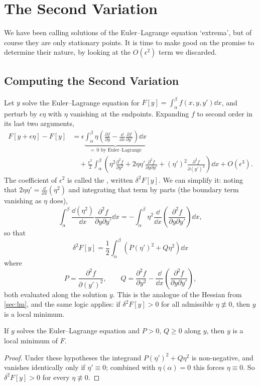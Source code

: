 \section{The Second Variation}\label{sec:secondvar}

We have been calling solutions of the Euler--Lagrange equation `extrema', but of course they are only stationary points. It is time to make good on the promise to determine their nature, by looking at the $O(\epsilon^2)$ term we discarded.

\subsection{Computing the Second Variation}

Let $y$ solve the Euler--Lagrange equation for $F[y] = \int_\alpha^\beta f(x,y,y')\dd x$, and perturb by $\epsilon\eta$ with $\eta$ vanishing at the endpoints. Expanding $f$ to second order in its last two arguments,
\begin{align*}
	F[y + \epsilon\eta] - F[y] &= \epsilon \underbrace{\int_\alpha^\beta \eta\left(\frac{\partial f}{\partial y} - \frac{\dd}{\dd x}\frac{\partial f}{\partial y'}\right)\dd x}_{= \,0 \text{ by Euler--Lagrange}} \\
	&\quad + \frac{\epsilon^2}{2}\int_\alpha^\beta\left(\eta^2 \frac{\partial^2 f}{\partial y^2} + 2\eta\eta'\frac{\partial^2 f}{\partial y \partial y'} + (\eta')^2\frac{\partial^2 f}{\partial (y')^2}\right)\dd x + O(\epsilon^3).
\end{align*}
The coefficient of $\epsilon^2$ is called the , written $\delta^2 F[y]$. We can simplify it: noting that $2\eta\eta' = \frac{\dd}{\dd x}(\eta^2)$ and integrating that term by parts (the boundary term vanishing as $\eta$ does),
$$
\int_\alpha^\beta \frac{\dd (\eta^2)}{\dd x}\frac{\partial^2 f}{\partial y\partial y'}\dd x = -\int_\alpha^\beta \eta^2 \frac{\dd}{\dd x}\left(\frac{\partial^2 f}{\partial y \partial y'}\right)\dd x,
$$
so that
$$
\boxed{\ \delta^2 F[y] = \frac{1}{2}\int_\alpha^\beta\left(P(\eta')^2 + Q\eta^2\right)\dd x\ }
$$
where
$$
P = \frac{\partial^2 f}{\partial (y')^2}, \qquad Q = \frac{\partial^2 f}{\partial y^2} - \frac{\dd}{\dd x}\left(\frac{\partial^2 f}{\partial y \partial y'}\right),
$$
both evaluated along the solution $y$. This is the analogue of the Hessian from \autoref{sec:lm}, and the same logic applies: if $\delta^2 F[y] > 0$ for all admissible $\eta \not\equiv 0$, then $y$ is a local minimum.

\begin{proposition}
	If $y$ solves the Euler--Lagrange equation and $P > 0$, $Q \geq 0$ along $y$, then $y$ is a local minimum of $F$.
\end{proposition}
\begin{proof}
	Under these hypotheses the integrand $P(\eta')^2 + Q\eta^2$ is non-negative, and vanishes identically only if $\eta' \equiv 0$; combined with $\eta(\alpha) = 0$ this forces $\eta \equiv 0$. So $\delta^2 F[y] > 0$ for every $\eta\not\equiv 0$.
\end{proof}

